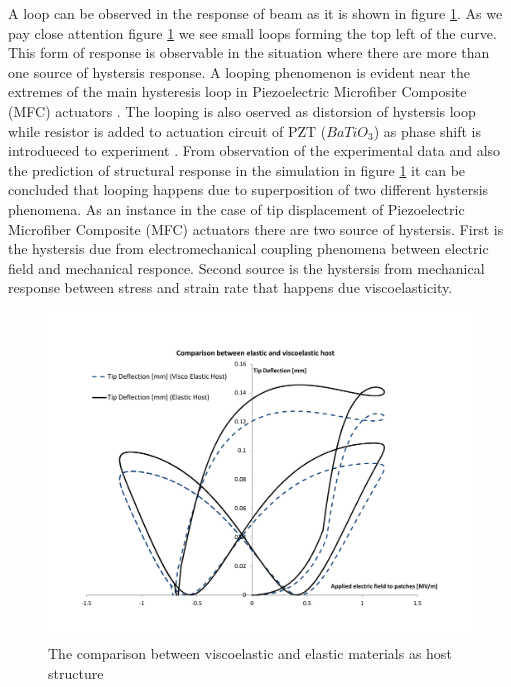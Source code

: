 A loop can be observed in the response of beam as it is shown in figure \ref{fig:ViscoHostCompositeActiveBeam}. 
As we pay close attention figure \ref{fig:ViscoHostCompositeActiveBeam} we see small loops forming the top left of the curve.
This form of response is observable in the situation where there are more than one source of hystersis response.
A looping phenomenon is evident near the extremes of the main hysteresis loop in Piezoelectric Microfiber Composite (MFC) actuators \cite{usher2013piezoelectric}.
The looping is also oserved as distorsion of hystersis loop while resistor is added to actuation circuit of PZT ($BaTiO_3$) as phase shift is introdueced to experiment \cite{jaffe2012piezoelectric}.
From observation of the experimental data and also the prediction of structural response in the simulation in figure \ref{fig:ViscoHostCompositeActiveBeam} it can be concluded that looping happens due to superposition of two different hystersis phenomena.
As an instance in the case of tip displacement of Piezoelectric Microfiber Composite (MFC) actuators \cite{usher2013piezoelectric} there are two source of hystersis.
First is the hystersis due from electromechanical coupling phenomena between electric field and mechanical responce.
Second source is the hystersis from mechanical response between stress and strain rate that happens due viscoelasticity.   

\begin{figure} 
\centering
\includegraphics[width=6.0in]{./chap_2_pol_sw/figures/ViscoHostCompositeActiveBeam.pdf}
\caption{The comparison between viscoelastic and elastic materials as host structure}
\label{fig:ViscoHostCompositeActiveBeam}
\end{figure}

